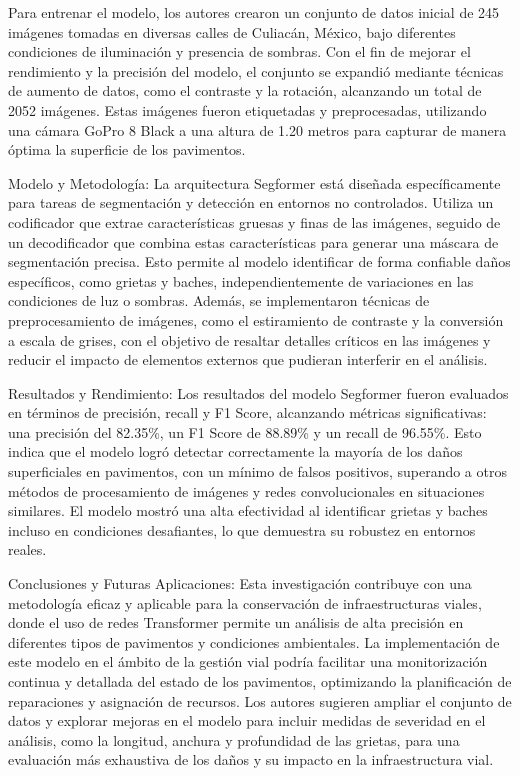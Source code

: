 Para entrenar el modelo, los autores crearon un conjunto de datos inicial de 245 imágenes tomadas en diversas calles de Culiacán, México, bajo diferentes condiciones de iluminación y presencia de sombras. Con el fin de mejorar el rendimiento y la precisión del modelo, el conjunto se expandió mediante técnicas de aumento de datos, como el contraste y la rotación, alcanzando un total de 2052 imágenes. Estas imágenes fueron etiquetadas y preprocesadas, utilizando una cámara GoPro 8 Black a una altura de 1.20 metros para capturar de manera óptima la superficie de los pavimentos.

Modelo y Metodología: La arquitectura Segformer está diseñada específicamente para tareas de segmentación y detección en entornos no controlados. Utiliza un codificador que extrae características gruesas y finas de las imágenes, seguido de un decodificador que combina estas características para generar una máscara de segmentación precisa. Esto permite al modelo identificar de forma confiable daños específicos, como grietas y baches, independientemente de variaciones en las condiciones de luz o sombras. Además, se implementaron técnicas de preprocesamiento de imágenes, como el estiramiento de contraste y la conversión a escala de grises, con el objetivo de resaltar detalles críticos en las imágenes y reducir el impacto de elementos externos que pudieran interferir en el análisis.

Resultados y Rendimiento: Los resultados del modelo Segformer fueron evaluados en términos de precisión, recall y F1 Score, alcanzando métricas significativas: una precisión del 82.35\%, un F1 Score de 88.89\% y un recall de 96.55\%. Esto indica que el modelo logró detectar correctamente la mayoría de los daños superficiales en pavimentos, con un mínimo de falsos positivos, superando a otros métodos de procesamiento de imágenes y redes convolucionales en situaciones similares. El modelo mostró una alta efectividad al identificar grietas y baches incluso en condiciones desafiantes, lo que demuestra su robustez en entornos reales.

Conclusiones y Futuras Aplicaciones: Esta investigación contribuye con una metodología eficaz y aplicable para la conservación de infraestructuras viales, donde el uso de redes Transformer permite un análisis de alta precisión en diferentes tipos de pavimentos y condiciones ambientales. La implementación de este modelo en el ámbito de la gestión vial podría facilitar una monitorización continua y detallada del estado de los pavimentos, optimizando la planificación de reparaciones y asignación de recursos. Los autores sugieren ampliar el conjunto de datos y explorar mejoras en el modelo para incluir medidas de severidad en el análisis, como la longitud, anchura y profundidad de las grietas, para una evaluación más exhaustiva de los daños y su impacto en la infraestructura vial.

